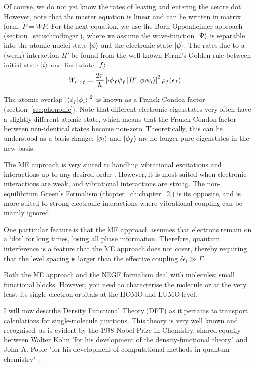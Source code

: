 Of course, we do not yet know the rates of leaving and entering the centre dot. However, note that the master equation is linear and can be written in matrix form, $\dot{P} = W P$. For the next equation, we use the Born-Oppenheimer approach (section~\ref{sec:schrodinger}), where we assume the wave-function $\ket{\Psi}$ is separable into the atomic nuclei state $\ket{\phi}$ and the electronic state $\ket{\psi}$. The rates due to a (weak) interaction $H'$ be found from the well-known Fermi's Golden rule between initial state $\ket{i}$ and final state $\ket{f}$:
\begin{align*}
W_{i\rightarrow f} &= \frac{2\pi}{\hslash} \left| \braket{\phi_f \psi_f \left|H'\right| \phi_i \psi_i}\right|^2 \rho_f (\epsilon_f)
\end{align*}

The atomic overlap $\left| \braket{ \phi_f | \phi_i }\right|^2$ is known as a Franck-Condon factor (section~\ref{sec:phononic}). Note that different electronic eigenstates very often have a slightly different atomic state, which means that the Franck-Condon factor between non-identical states become non-zero. Theoretically, this can be understood as a basis change; $\ket{\phi_i}$ and $\ket{\phi_f}$ are no longer pure eigenstates in the new basis. 

The ME approach is very suited to handling vibrational excitations and interactions up to any desired order \cite{seldenthuis}. However, it is most suited when electronic interactions are weak, and vibrational interactions are strong. The non-equilibrium Green's Formalism (chapter~\ref{ch:chapter_2}) is its opposite, and is more suited to strong electronic interactions where vibrational coupling can be mainly ignored. 

One particular feature is that the ME approach assumes that electrons remain on a `dot' for long times, losing all phase information. Therefore, quantum interference is a feature that the ME approach does not cover, thereby requiring that the level spacing is larger than the effective coupling $\delta \epsilon_i \gg \Gamma$.

Both the ME approach and the NEGF formalism deal with molecules; small functional blocks. However, you need to characterise the molecule or at the very least its single-electron orbitals at the HOMO and LUMO level. 

I will now describe Density Functional Theory (DFT) as it pertains to transport calculations for single-molecule junctions. This theory is very well known and recognised, as is evident by the 1998 Nobel Prize in Chemistry, shared equally between Walter Kohn "for his development of the density-functional theory" and John A. Pople "for his development of computational methods in quantum chemistry"~\cite{nobel1998}. 

